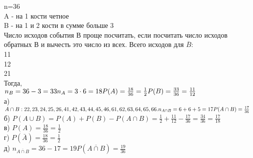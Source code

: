 \documentclass[12pt]{article}
\begin{document}
n=36\\
A - на 1 кости четное\\
B - на 1 и 2 кости в сумме больше 3\\
Число исходов события В проще посчитать, если посчитать число исходов обратных В и вычесть это число из всех.
Всего исходов для $\overline{B}$:\\
11\\
12\\
21\\
Тогда,\\
$
n_B=36-3=33\\
n_A=3\cdot6=18\\
P(A)=\frac{18}{36}=\frac{1}{2}\\
P(B)=\frac{33}{36}=\frac{11}{12}\\
$\\
а)
$
A \cap B:\\
22,
23,
24,
25,
26,
\\
41,
42,
43,
44,
45,
46,
\\
61,
62,
63,
64,
65,
66.
\\
n_{A \cap B}=6+6+5=17\\
P(A \cap B) = \frac{17}{36}\\
$
б)
$
P(A \cup B) = P(A)+P(B)-P(A \cap B)=\frac{1}{2}+\frac{11}{12}-\frac{17}{36}=\frac{34}{36}=\frac{17}{18}
$\\
в)
$
P(A)=\frac{18}{36}=\frac{1}{2}
$\\
г)
$
P(\bar{A})=\frac{18}{36}=\frac{1}{2}
$\\
д)
$
n_{\overline{A \cap B}}=36-17=19
P(\overline{A \cap B})=\frac{19}{36}
$
\end{document}
